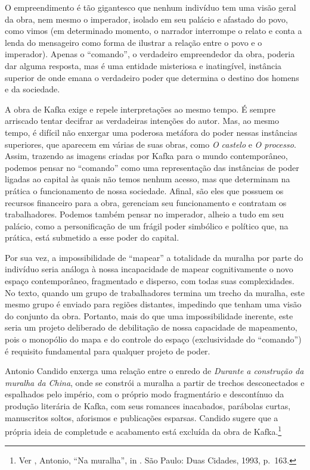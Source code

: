 O empreendimento é tão gigantesco que nenhum indivíduo tem uma visão
geral da obra, nem mesmo o imperador, isolado em seu palácio e afastado
do povo, como vimos (em determinado momento, o narrador interrompe o
relato e conta a lenda do mensageiro como forma de ilustrar a relação
entre o povo e o imperador). Apenas o ``comando'', o verdadeiro \label{comando}
empreendedor da obra, poderia dar alguma resposta, mas é uma entidade
misteriosa e inatingível, instância superior de onde emana o verdadeiro
poder que determina o destino dos homens e da sociedade.

A obra de Kafka exige e repele interpretações ao mesmo tempo. É sempre
arriscado tentar decifrar as verdadeiras intenções do autor. Mas, ao
mesmo tempo, é difícil não enxergar uma poderosa metáfora do poder
nessas instâncias superiores, que aparecem em várias de suas obras, como
\emph{O castelo} e \emph{O processo}. Assim, trazendo as imagens criadas
por Kafka para o mundo contemporâneo, podemos pensar no ``comando'' como
uma representação das instâncias de poder ligadas ao capital às quais
não temos nenhum acesso, mas que determinam na prática o funcionamento
de nossa sociedade. Afinal, são eles que possuem os recursos financeiro
para a obra, gerenciam seu funcionamento e contratam os trabalhadores.
Podemos também pensar no imperador, alheio a tudo em seu palácio, como a
personificação de um frágil poder simbólico e político que, na prática,
está submetido a esse poder do capital.

Por sua vez, a impossibilidade de ``mapear'' a totalidade da muralha por
parte do indivíduo seria análoga à nossa incapacidade de mapear
cognitivamente o novo espaço contemporâneo, fragmentado e disperso, com
todas suas complexidades. No texto, quando um grupo de trabalhadores
termina um trecho da muralha, este mesmo grupo é enviado para regiões
distantes, impedindo que tenham uma visão do conjunto da obra. Portanto,
mais do que uma impossibilidade inerente, este seria um projeto
deliberado de debilitação de nossa capacidade de mapeamento, pois o
monopólio do mapa e do controle do espaço (exclusividade do ``comando'')
é requisito fundamental para qualquer projeto de poder.

Antonio Candido enxerga uma relação entre o enredo de \emph{Durante a
construção da muralha da China}, onde se constrói a muralha a partir de
trechos desconectados e espalhados pelo império, com o próprio modo
fragmentário e descontínuo da produção literária de Kafka, com seus
romances inacabados, parábolas curtas, manuscritos soltos, aforismos e
publicações esparsas. Candido sugere que a própria ideia de completude e
acabamento está excluída da obra de Kafka.\footnote{Ver ,
  Antonio, ``Na muralha'', in {}. São Paulo:
  Duas Cidades, 1993, p.~163.}

